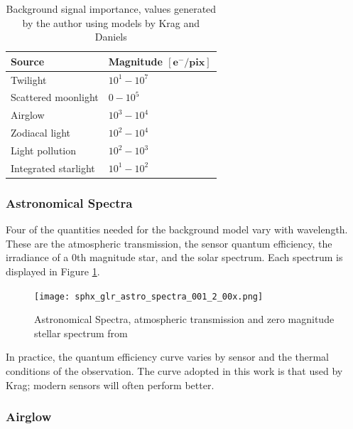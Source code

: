 \begin{table}[]
  \centering
  \begin{tabular}{|l|l|}
  \hline
  \textbf{Source} & \textbf{Magnitude} $\mathbf{\left[ e^- / \textbf{pix}\right]}$ \\ \hline
  Twilight               & $10^1 - 10^7$                              \\ \hline
  Scattered moonlight    & $0 - 10^5$                                 \\ \hline
  Airglow                & $10^3 - 10^4$                              \\ \hline
  Zodiacal light         & $10^2 - 10^4$                              \\ \hline
  Light pollution        & $10^2 - 10^3$                              \\ \hline
  Integrated starlight   & $10^1 - 10^2$                              \\ \hline
  \end{tabular}
  \caption{Background signal importance, values generated by the author using models by Krag and Daniels \cite{krag2003, daniels1977}}
  \label{tb:signal_importance}
\end{table}

\subsubsection{Astronomical Spectra}

Four of the quantities needed for the background model vary with wavelength. These are the atmospheric transmission, the sensor quantum efficiency, the irradiance of a 0th magnitude star, and the solar spectrum. Each spectrum is displayed in Figure \ref{fig:spectra}.

\begin{figure}[ht]
  \centering
  \texttt{[image: sphx\_glr\_astro\_spectra\_001\_2\_00x.png]}
  \caption{Astronomical Spectra, atmospheric transmission and zero magnitude stellar spectrum from \cite{krag2003}}
  \label{fig:spectra}
\end{figure}

In practice, the quantum efficiency curve varies by sensor and the thermal conditions of the
observation. The curve adopted in this work is that used by Krag; modern sensors will often
perform better.

\subsubsection{Airglow}

